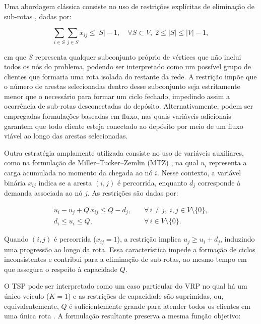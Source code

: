 Uma abordagem clássica consiste no uso de restrições explícitas de eliminação de sub-rotas \cite{dantzig2009solution}, dadas por:

\begin{equation}
\sum_{i \in S} \sum_{j \in S} x_{ij} \leq |S| - 1, 
\quad \forall S \subset V,\; 2 \leq |S| \leq |V|-1,
\end{equation}

\noindent em que $S$ representa qualquer subconjunto próprio de vértices que não inclui todos os nós do problema, podendo ser interpretado como um possível grupo de clientes que formaria uma rota isolada do restante da rede. A restrição impõe que o número de arestas selecionadas dentro desse subconjunto seja estritamente menor que o necessário para formar um ciclo fechado, impedindo assim a ocorrência de sub-rotas desconectadas do depósito. Alternativamente, podem ser empregadas formulações baseadas em fluxo, nas quais variáveis adicionais garantem que todo cliente esteja conectado ao depósito por meio de um fluxo viável ao longo das arestas selecionadas.

Outra estratégia amplamente utilizada consiste no uso de variáveis auxiliares, como na formulação de Miller--Tucker--Zemlin (MTZ) \cite{miller1960integer}, na qual $u_i$ representa a carga acumulada no momento da chegada ao nó $i$. Nesse contexto, a variável binária $x_{ij}$ indica se a aresta $(i,j)$ é percorrida, enquanto $d_j$ corresponde à demanda associada ao nó $j$. As restrições são dadas por:

\begin{eqnarray}
u_i - u_j + Q\, x_{ij} \leq Q - d_j, & \quad \forall\, i \neq j,\; i,j \in V \setminus \{0\}, \\[4pt]
d_i \leq u_i \leq Q, & \quad \forall\, i \in V \setminus \{0\}.
\end{eqnarray}

Quando $(i,j)$ é percorrida ($x_{ij}=1$), a restrição implica $u_j \geq u_i + d_j$, induzindo uma progressão ao longo da rota. Essa característica impede a formação de ciclos inconsistentes e contribui para a eliminação de sub-rotas, ao mesmo tempo em que assegura o respeito à capacidade $Q$.

O TSP pode ser interpretado como um caso particular do VRP no qual há um único veículo ($K = 1$) \cite{toth2002vehicle} e as restrições de capacidade são suprimidas, ou, equivalentemente, $Q$ é suficientemente grande para atender todos os clientes em uma única rota \cite{balinski1964integer, eilon1974distribution}. A formulação resultante preserva a mesma função objetivo:

